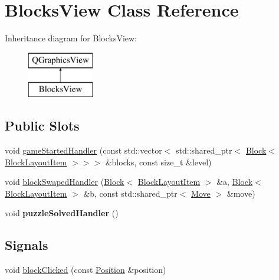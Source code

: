 \hypertarget{class_blocks_view}{}\section{Blocks\+View Class Reference}
\label{class_blocks_view}
Inheritance diagram for Blocks\+View\+:\begin{figure}[H]
\begin{center}
\leavevmode
\includegraphics[height=2.000000cm]{class_blocks_view}
\end{center}
\end{figure}
\subsection*{Public Slots}
\begin{DoxyCompactItemize}
\item 
void \mbox{\hyperlink{class_blocks_view_a23c0b8242274f9627a91dba5fa8af036}{game\+Started\+Handler}} (const std\+::vector$<$ std\+::shared\+\_\+ptr$<$ \mbox{\hyperlink{class_block}{Block}}$<$ \mbox{\hyperlink{class_block_layout_item}{Block\+Layout\+Item}} $>$$>$$>$ \&blocks, const size\+\_\+t \&level)
\item 
void \mbox{\hyperlink{class_blocks_view_ad7f8487f26dd09d0058e8774f5f443b4}{block\+Swaped\+Handler}} (\mbox{\hyperlink{class_block}{Block}}$<$ \mbox{\hyperlink{class_block_layout_item}{Block\+Layout\+Item}} $>$ \&a, \mbox{\hyperlink{class_block}{Block}}$<$ \mbox{\hyperlink{class_block_layout_item}{Block\+Layout\+Item}} $>$ \&b, const std\+::shared\+\_\+ptr$<$ \mbox{\hyperlink{struct_move}{Move}} $>$ \&move)
\item 
\mbox{\label{class_blocks_view_aac769b83129ef5e37c4ab6c680cc13a1}} 
void {\bfseries puzzle\+Solved\+Handler} ()
\end{DoxyCompactItemize}
\subsection*{Signals}
\begin{DoxyCompactItemize}
\item 
void \mbox{\hyperlink{class_blocks_view_ace9e48402539d2e3945ce794d7ae7dd9}{block\+Clicked}} (const \mbox{\hyperlink{struct_position}{Position}} \&position)
\end{DoxyCompactItemize}
